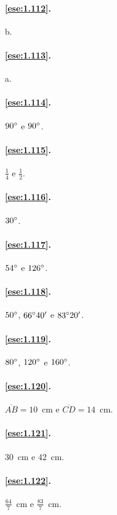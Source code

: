 \paragraph{\ref{ese:1.112}.}
b.

\paragraph{\ref{ese:1.113}.}
a.

\paragraph{\ref{ese:1.114}.}
$90{}^{\circ}$ e $90{}^{\circ}$.

\paragraph{\ref{ese:1.115}.}
$\frac{1}{4}$ e $\frac{1}{2}$.

\paragraph{\ref{ese:1.116}.}
$30{}^{\circ}$.

\paragraph{\ref{ese:1.117}.}
$54{}^{\circ}$ e $126{}^{\circ}$.

\paragraph{\ref{ese:1.118}.}
$50{}^{\circ}$, $66{}^{\circ} 40'$ e $83{}^{\circ} 20'$.

\paragraph{\ref{ese:1.119}.}
$80{}^{\circ}$, $120{}^{\circ}$ e $160{}^{\circ}$.

\paragraph{\ref{ese:1.120}.}
$\overline{AB}=10$~cm e $\overline{CD}=14$~cm.

\paragraph{\ref{ese:1.121}.}
$30$~cm e $42$~cm.

\paragraph{\ref{ese:1.122}.}
$\frac{64}{7}$~cm e $\frac{83}{7}$~cm.

